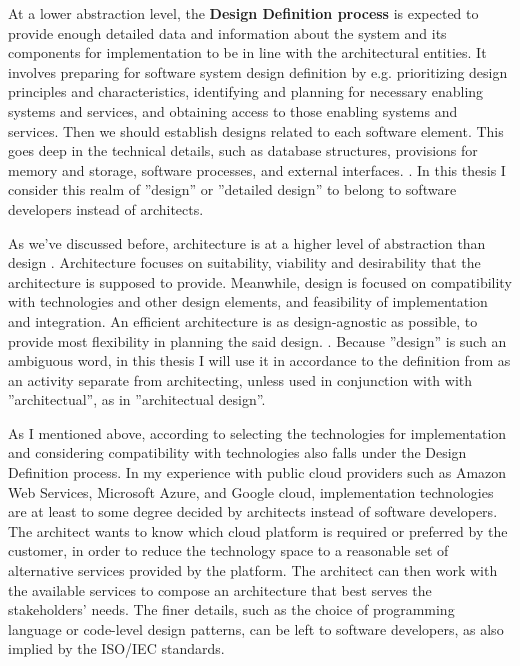 \documentclass[utf8,english]{gradu3}
\begin{document}
At a lower abstraction level, the \textbf{Design Definition process}
\parencite[71]{IEEE12207} is expected to provide enough detailed data and
information about the system and its components for implementation to be in line
with the architectural entities. It involves preparing for software system
design definition by e.g. prioritizing design principles and characteristics,
identifying and planning for necessary enabling systems and services, and
obtaining access to those enabling systems and services. Then we should establish
designs related to each software element. This goes deep in the technical
details, such as database structures, provisions for memory and storage,
software processes, and external interfaces. \parencite[72]{IEEE12207}. In this
thesis I consider this realm of ''design'' or ''detailed design'' to belong to
software developers instead of architects.

As we've discussed before, architecture is at a higher level of abstraction than
design \parencite{IEEE12207}. Architecture focuses on suitability, viability and
desirability that the architecture is supposed to provide. Meanwhile, design is
focused on compatibility with technologies and other design elements, and
feasibility of implementation and integration. An efficient architecture is as
design-agnostic as possible, to provide most flexibility in planning the said
design. \parencite[71]{IEEE12207}. Because ''design'' is such an ambiguous word,
in this thesis I will use it in accordance to the definition from
\textcite{IEEE12207} as an activity separate from architecting, unless used in
conjunction with with ''architectual'', as in ''architectual design''.

As I mentioned above, according to \textcite[71-72]{IEEE12207} selecting the technologies for
implementation and considering compatibility with technologies also falls under
the Design Definition process. In my experience with public cloud providers such
as Amazon Web Services, Microsoft Azure, and Google cloud, implementation
technologies are at least to some degree decided by architects instead of
software developers. The architect wants to know which cloud platform is
required or preferred by the customer, in order to reduce the technology space
to a reasonable set of alternative services provided by the platform. The
architect can then work with the available services to compose an architecture
that best serves the stakeholders' needs. The finer details, such as the choice
of programming language or code-level design patterns, can be left to software
developers, as also implied by the ISO/IEC standards.
\end{document}
